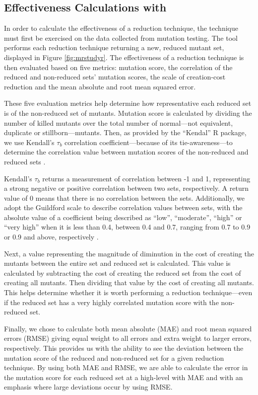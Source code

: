 \subsection{Effectiveness Calculations with \mr}

In order to calculate the effectiveness of a reduction technique, the technique
must first be exercised on the data collected from mutation testing. The \mr tool
performs each reduction technique returning a new, reduced mutant set,
displayed in Figure \ref{fig:mrstudyr}. The effectiveness of a reduction technique is then evaluated
based on five metrics: mutation score, the correlation of the reduced and non-reduced sets' mutation scores,
the scale of creation-cost reduction and the mean absolute and root mean squared error.

These five evaluation metrics help determine how representative each reduced
set is of the non-reduced set of mutants. Mutation score is calculated
by dividing the number of killed mutants over the total number of normal---not
equivalent, duplicate or stillborn---mutants. Then, as provided by the ``Kendal'' R package,
we use Kendall's $\tau_b$ correlation coefficient---because of its tie-awareness---to
determine the correlation value between mutation scores of the non-reduced and reduced sets \cite{mcleod2005kendall}.

Kendall's $\tau_b$ returns a measurement of correlation between -1 and 1, representing
a strong negative or positive correlation between two sets, respectively. A return value
of 0 means that there is no correlation between the sets. Additionally, we adopt the
Guildford scale to describe correlation values between sets, with the absolute value
of a coefficient being described as ``low'', ``moderate'', ``high'' or ``very high'' when
it is less than 0.4, between 0.4 and 0.7, ranging from 0.7 to 0.9 or 0.9 and above, respectively \cite{inozemtseva2014coverage}.

Next, a value representing the magnitude of diminution in the cost of
creating the mutants between the entire set
and reduced set is calculated. This value is calculated by subtracting
the cost of creating the reduced set from the cost of creating all mutants. Then
dividing that value by the cost of creating all mutants. This helps
determine whether it is worth performing a reduction technique---even if the
reduced set has a very highly correlated mutation score with the non-reduced set.

Finally, we chose to calculate both mean absolute (MAE) and root mean
squared errors (RMSE) giving equal weight to
all errors and extra weight to larger errors, respectively. This provides
us with the ability to see the deviation between the mutation score of the reduced and
non-reduced set for a given reduction technique. By using both MAE and RMSE,
we are able to calculate the error in the mutation score for each reduced set
at a high-level with MAE and with an emphasis where large deviations occur by using RMSE.
